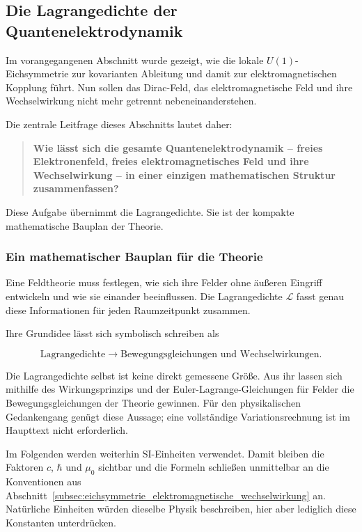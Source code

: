 \subsection{Die Lagrangedichte der Quantenelektrodynamik}
\label{subsec:lagrangedichte_quantenelektrodynamik}

Im vorangegangenen Abschnitt wurde gezeigt, wie die lokale
\(U(1)\)-Eichsymmetrie zur kovarianten Ableitung und damit zur
elektromagnetischen Kopplung führt. Nun sollen das Dirac-Feld, das
elektromagnetische Feld und ihre Wechselwirkung nicht mehr getrennt
nebeneinanderstehen.

Die zentrale Leitfrage dieses Abschnitts lautet daher:

\begin{quote}
	\textbf{Wie lässt sich die gesamte Quantenelektrodynamik -- freies
	Elektronenfeld, freies elektromagnetisches Feld und ihre Wechselwirkung
	-- in einer einzigen mathematischen Struktur zusammenfassen?}
\end{quote}

Diese Aufgabe übernimmt die
Lagrangedichte.
Sie ist der kompakte mathematische Bauplan der Theorie.

\subsubsection*{Ein mathematischer Bauplan für die Theorie}

Eine Feldtheorie muss festlegen, wie sich ihre Felder ohne äußeren
Eingriff entwickeln und wie sie einander beeinflussen. Die
Lagrangedichte \(\mathcal L\) fasst genau diese Informationen für jeden
Raumzeitpunkt zusammen.

Ihre Grundidee lässt sich symbolisch schreiben als

\begin{equation*}
	\text{Lagrangedichte}
	\longrightarrow
	\text{Bewegungsgleichungen und Wechselwirkungen}.
\end{equation*}

Die Lagrangedichte selbst ist keine direkt gemessene Größe. Aus ihr
lassen sich mithilfe des Wirkungsprinzips und der
Euler-Lagrange-Gleichungen für Felder
die Bewegungsgleichungen der Theorie gewinnen. Für den physikalischen
Gedankengang genügt diese Aussage; eine vollständige Variationsrechnung
ist im Haupttext nicht erforderlich.

Im Folgenden werden weiterhin SI-Einheiten verwendet. Damit bleiben die
Faktoren \(c\), \(\hbar\) und \(\mu_0\) sichtbar und die Formeln schließen
unmittelbar an die Konventionen aus
Abschnitt~\ref{subsec:eichsymmetrie_elektromagnetische_wechselwirkung}
an. Natürliche Einheiten würden dieselbe Physik beschreiben, hier aber
lediglich diese Konstanten unterdrücken.

